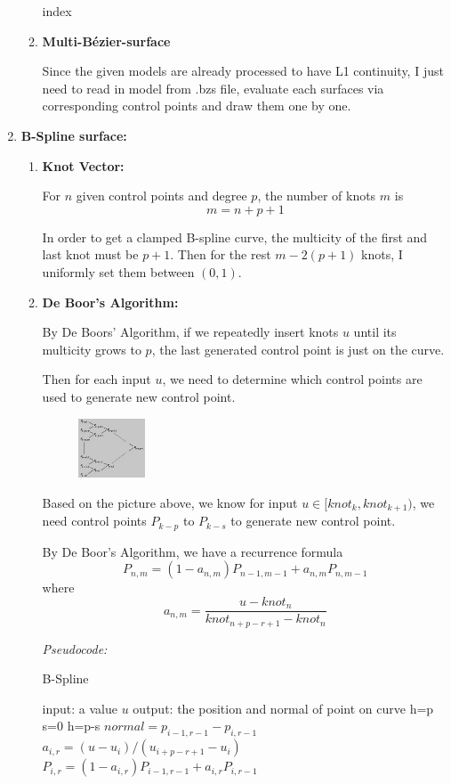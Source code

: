 \documentclass[acmtog]{acmart}
\begin{document}
\begin{enumerate}
\begin{enumerate}
\begin{algorithm}[H]
\begin{algorithmic}
				\RETURN index
			\end{algorithmic} 
		\end{algorithm}
		\item {\bf Multi-Bézier-surface}
		\par Since the given models are already processed to have L1 continuity, I just need to read in model from .bzs file, evaluate each surfaces via corresponding control points and draw them one by one.
	\end{enumerate}
	\item {\bf B-Spline surface:}
	\begin{enumerate}
		\setlength\parindent{2em}
		\item {\bf Knot Vector:}
		\par For $n$ given control points and degree $p$, the number of knots $m$ is 
		\[m=n+p+1\]
		\par In order to get a clamped B-spline curve, the multicity of the first and last knot must be $p+1$. Then for the rest $m-2(p+1)$ knots, I uniformly set them between $(0,1)$.
		\item {\bf De Boor's Algorithm:}
		\par By De Boors' Algorithm, if we repeatedly insert knots $u$ until its multicity grows to $p$, the last generated control point is just on the curve.
		\par Then for each input $u$, we need to determine which control points are used to generate new control point. 
		\begin{figure}[H]
			\centering
			\includegraphics[width=0.2\textwidth]{"de-boor-tri-1.jpg"}
		\end{figure}
		\par Based on the picture above, we know for input $u\in[knot_k, knot_{k+1})$, we need control points $P_{k-p}$ to $P_{k-s}$ to generate new control point.
		\par By De Boor's Algorithm, we have a recurrence formula
		\[P_{n,m}=(1-a_{n,m})P_{n-1,m-1}+a_{n,m}P_{n,m-1}\]
		where \[a_{n,m}=\frac{u-knot_{n}}{knot_{n+p-r+1}-knot_{n}}\]
		\par {\it Pseudocode:}
		\begin{algorithm}
			\caption{B-Spline} 
			\begin{algorithmic}
				\STATE input: a value $u$
				\STATE output: the position and normal of point on curve
				\IF{$u\in[u_k,u_{k+1})$ and $u\neq u_k$}
					\STATE h=p
					\STATE s=0
				\ENDIF
					\STATE h=p-s
				\ENDIF
							\STATE $normal= p_{i-1,r-1}-p_{i,r-1}$
						\ENDIF
						\STATE $a_{i,r}=(u-u_i)/(u_{i+p-r+1}-u_i)$
						\STATE $P_{i,r}=(1-a_{i,r})P_{i-1,r-1}+a_{i,r}P_{i,r-1}$
					\ENDFOR
				\ENDFOR
				

\end{algorithmic}
\end{algorithm}
\end{enumerate}
\end{enumerate}
\end{document}
